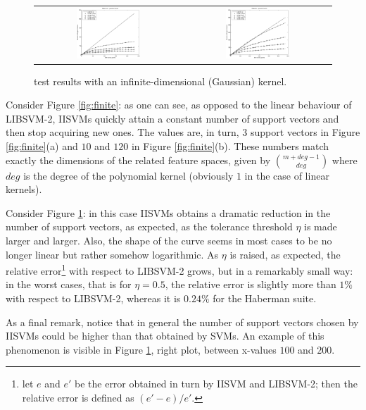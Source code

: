 \begin{figure}[!htbp]
  \begin{center}
    \begin{tabular}{cc}
       \includegraphics[width=0.45\textwidth]{Haberman_gaussian} &
       \includegraphics[width=0.45\textwidth]{Diabetes_gaussian}
    \end{tabular}
  \end{center}
  \caption{\label{fig:infinite} test results with an infinite-dimensional
  (Gaussian) kernel.}
\end{figure}

Consider Figure \ref{fig:finite}: as one can see, as opposed to the
linear behaviour of LIBSVM-2, IISVMs quickly attain a constant number
of support vectors and then stop acquiring new ones. The values are,
in turn, $3$ support vectors in Figure \ref{fig:finite}(a) and $10$
and $120$ in Figure \ref{fig:finite}(b). These numbers match exactly
the dimensions of the related feature spaces, given by
$\binom{m+deg-1}{deg}$ where $deg$ is the degree of the polynomial
kernel (obviously $1$ in the case of linear kernels).

Consider Figure \ref{fig:infinite}: in this case IISVMs obtains a
dramatic reduction in the number of support vectors, as expected, as
the tolerance threshold $\eta$ is made larger and larger. Also, the
shape of the curve seems in most cases to be no longer linear but
rather somehow logarithmic. As $\eta$ is raised, as expected, the
relative error\footnote{let $e$ and $e'$ be the error obtained
in turn by IISVM and LIBSVM-2; then the relative error is defined as
$(e'-e)/e'$.} with respect to LIBSVM-2 grows, but
in a remarkably small way: in the worst cases, that is for $\eta=0.5$,
the relative error is slightly more than $1\%$ with respect to
LIBSVM-2, whereas it is $0.24\%$ for the Haberman suite.

As a final remark, notice that in general the number of support
vectors chosen by IISVMs could be higher than that obtained by
SVMs. An example of this phenomenon is visible in Figure
\ref{fig:infinite}, right plot, between x-values $100$ and $200$.
